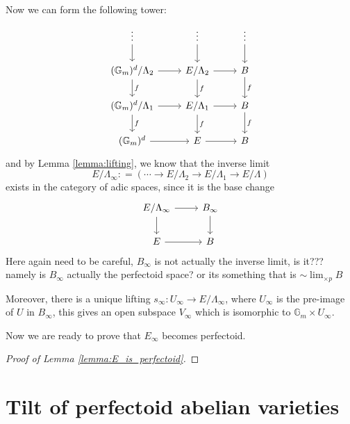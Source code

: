 \documentclass[11pt,oneside]{amsart}
\theoremstyle{theorem}
\theoremstyle{definition}
\theoremstyle{remark}
\begin{document}
Now we can form the following tower: 
\[
\begin{tikzcd}
\vdots  \arrow{d} & \vdots \arrow{d} & \vdots \arrow{d} \\
(\mathbb G_m)^d/\Lambda_2 \arrow{r}{} \arrow{d}{f} & E/\Lambda_2 \arrow{r}{}  \arrow{d}{f } & B  \arrow{d}{f} \\ 
(\mathbb G_m)^d/\Lambda_1 \arrow{r}{} \arrow{d}{f} & E/\Lambda_1 \arrow{r}{}  \arrow{d}{f } & B  \arrow{d}{f} \\ 
(\mathbb G_m)^d  \arrow{r}{} & E \arrow{r}{} & B 
\end{tikzcd}
\]
and by Lemma \ref{lemma:lifting}, we know that the inverse limit 
$$ E/\Lambda_{\infty} : = ( \cdots \rightarrow E/\Lambda_2 \rightarrow  E/\Lambda_1 \rightarrow E/\Lambda) $$ exists in the category of adic spaces, since it is the base change 
\[
\begin{tikzcd}
E/\Lambda_\infty  \arrow{r}{} \arrow{d}{} & B_\infty \arrow{d}{} \\
E \arrow{r}{} & B
\end{tikzcd}
\]
{\color{red} Here again need to be careful, $B_\infty$ is not actually the inverse limit, is it??? namely is $B_\infty$ actually the perfectoid space? or its something that is $\sim \lim_{\times p} B$ }

Moreover, there is a unique lifting $s_\infty: U_\infty \rightarrow E/\Lambda_{\infty}$, where $U_\infty$ is the pre-image of $U$ in $B_\infty$, this gives an open subspace $V_\infty$ which is isomorphic to $\mathbb G_m \times U_\infty$. 

Now we are ready to prove that $E_\infty$ becomes perfectoid. 

\begin{proof}[Proof of Lemma \ref{lemma:E_is_perfectoid}]

\end{proof} 











\newpage

\section{Tilt of perfectoid abelian varieties}



\newpage
\end{document}
